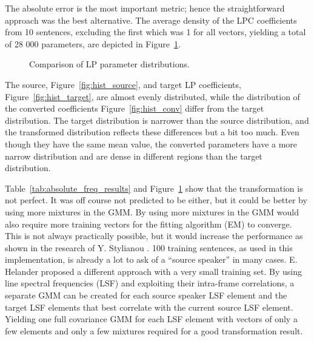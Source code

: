 The absolute error is the most important metric; hence the straightforward approach was the best alternative. The average density of the LPC coefficients from 10 sentences, excluding the first which was 1 for all vectors, yielding a total of 28 000 parameters, are depicted in Figure~\ref{fig:hist_lp}.
\begin{figure}[htbp]
	\begin{center}
	\caption{Comparison of LP parameter distributions.}
	\label{fig:hist_lp}
	\end{center}
\end{figure}
The source, Figure~\ref{fig:hist_source}, and target LP coefficients, Figure~\ref{fig:hist_target}, are almost evenly distributed, while the distribution of the converted coefficients Figure~\ref{fig:hist_conv} differ from the target distribution. The target distribution is narrower than the source distribution, and the transformed distribution reflects these differences but a bit too much. Even though they have the same mean value, the converted parameters have a more narrow distribution and are dense in different regions than the target distribution.

Table~\ref{tab:absolute_freq_results} and Figure~\ref{fig:hist_lp} show that the transformation is not perfect. It was off course not predicted to be either, but it could be better by using more mixtures in the GMM. By using more mixtures in the GMM would also require more training vectors for the fitting algorithm (EM) to converge. This is not always practically possible, but it would increase the performance as shown in the research of Y. Stylianou \etal \cite{stylianou98}. 100 training sentences, as used in this implementation, is already a lot to ask of a ``source speaker'' in many cases. E. Helander \etal \cite{helander08} proposed a different approach with a very small training set. By using line spectral frequencies (LSF) and exploiting their intra-frame correlations, a separate GMM can be created for each source speaker LSF element and the target LSF elements that best correlate with the current source LSF element. Yielding one full covariance GMM for each LSF element with vectors of only a few elements and only a few mixtures required for a good transformation result.

